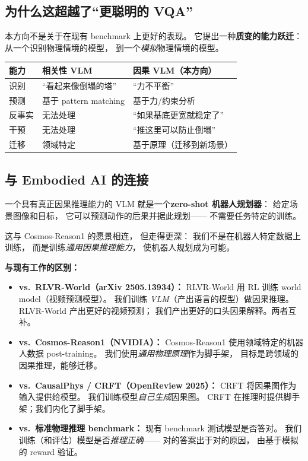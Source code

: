 \documentclass[12pt,a4paper]{article}
\begin{document}
\subsection{为什么这超越了``更聪明的 VQA''}

本方向不是关于在现有 benchmark 上更好的表现。
它提出一种\textbf{质变的能力跃迁}：
从一个识别物理情境的模型，
到一个\textit{模拟}物理情境的模型。

\begin{table}[h]
\centering
\small
\begin{tabular}{p{2.5cm}p{4.5cm}p{4.5cm}}
\toprule
\textbf{能力} & \textbf{相关性 VLM} & \textbf{因果 VLM（本方向）} \\
\midrule
识别 & ``看起来像倒塌的塔'' & ``力不平衡'' \\
预测 & 基于 pattern matching & 基于力/约束分析 \\
反事实 & 无法处理 & ``如果基底更宽就稳定了'' \\
干预 & 无法处理 & ``推这里可以防止倒塌'' \\
迁移 & 领域特定 & 基于原理（迁移到新场景） \\
\bottomrule
\end{tabular}
\end{table}

\subsection{与 Embodied AI 的连接}

一个具有真正因果推理能力的 VLM
就是一个\textbf{zero-shot 机器人规划器}：
给定场景图像和目标，
它可以预测动作的后果并据此规划——
不需要任务特定的训练。

这与 Cosmos-Reason1 的愿景相连，
但走得更深：
我们不是在机器人特定数据上训练，
而是训练\textit{通用因果推理能力}，
使机器人规划成为可能。

\begin{relatedbox}
\textbf{与现有工作的区别：}
\begin{itemize}[leftmargin=1.5em]
  \item \textbf{vs.\ RLVR-World（arXiv 2505.13934）：}
    RLVR-World 用 RL 训练 world model（视频预测模型）。
    我们训练 \textit{VLM}（产出语言的模型）做因果推理。
    RLVR-World 产出更好的视频预测；
    我们产出更好的口头因果解释。两者互补。
  \item \textbf{vs.\ Cosmos-Reason1（NVIDIA）：}
    Cosmos-Reason1 使用领域特定的机器人数据 post-training。
    我们使用\textit{通用物理原理}作为脚手架，
    目标是跨领域的因果推理，能够迁移。
  \item \textbf{vs.\ CausalPhys / CRFT（OpenReview 2025）：}
    CRFT 将因果图作为输入提供给模型。
    我们训练模型\textit{自己生成}因果图。
    CRFT 在推理时提供脚手架；我们内化了脚手架。
  \item \textbf{vs.\ 标准物理推理 benchmark：}
    现有 benchmark 测试模型是否答对。
    我们训练（和评估）模型是否\textit{推理正确}——
    对的答案出于对的原因，
    由基于模拟的 reward 验证。
\end{itemize}
\end{relatedbox}
\end{document}
